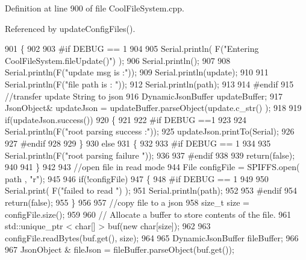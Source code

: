 Definition at line 900 of file Cool\+File\+System.\+cpp.



Referenced by update\+Config\+Files().


\begin{DoxyCode}
901 \{
902 
903 \textcolor{preprocessor}{#if DEBUG == 1}
904 
905     Serial.println( F(\textcolor{stringliteral}{"Entering CoolFileSystem.fileUpdate()"}) );
906     Serial.println();
907     
908     Serial.println(F(\textcolor{stringliteral}{"update msg is :"}));
909     Serial.println(update);
910     
911     Serial.println(F(\textcolor{stringliteral}{"file path is : "}));
912     Serial.println(path);   
913 
914 \textcolor{preprocessor}{#endif}
915     \textcolor{comment}{//transfer update String to json}
916     DynamicJsonBuffer updateBuffer;
917     JsonObject& updateJson = updateBuffer.parseObject(update.c\_str() );
918     
919     \textcolor{keywordflow}{if}(updateJson.success())
920     \{
921     
922 \textcolor{preprocessor}{    #if DEBUG ==1}
923         
924         Serial.println(F(\textcolor{stringliteral}{"root parsing success :"}));
925         updateJson.printTo(Serial);
926     
927 \textcolor{preprocessor}{    #endif}
928 
929     \}
930     \textcolor{keywordflow}{else}
931     \{
932     
933 \textcolor{preprocessor}{    #if DEBUG == 1 }
934     
935         Serial.println(F(\textcolor{stringliteral}{"root parsing failure "}));
936     
937 \textcolor{preprocessor}{    #endif}
938         
939         \textcolor{keywordflow}{return}(\textcolor{keyword}{false});  
940 
941     \}
942     
943     \textcolor{comment}{//open file in read mode}
944     File configFile = SPIFFS.open( path , \textcolor{stringliteral}{"r"});
945     
946     \textcolor{keywordflow}{if}(!configFile)
947     \{   
948 \textcolor{preprocessor}{    #if DEBUG == 1}
949         
950         Serial.print( F(\textcolor{stringliteral}{"failed to read "}) );
951         Serial.println(path);
952 
953 \textcolor{preprocessor}{    #endif}
954         \textcolor{keywordflow}{return}(\textcolor{keyword}{false});
955     \}
956 
957     \textcolor{comment}{//copy file to a json}
958     \textcolor{keywordtype}{size\_t} size = configFile.size();
959 
960     \textcolor{comment}{// Allocate a buffer to store contents of the file.}
961     std::unique\_ptr < char[] > buf(\textcolor{keyword}{new} \textcolor{keywordtype}{char}[size]);
962 
963     configFile.readBytes(buf.get(), size);
964 
965     DynamicJsonBuffer fileBuffer;
966 
967     JsonObject & fileJson = fileBuffer.parseObject(buf.get());

\end{DoxyCode}
